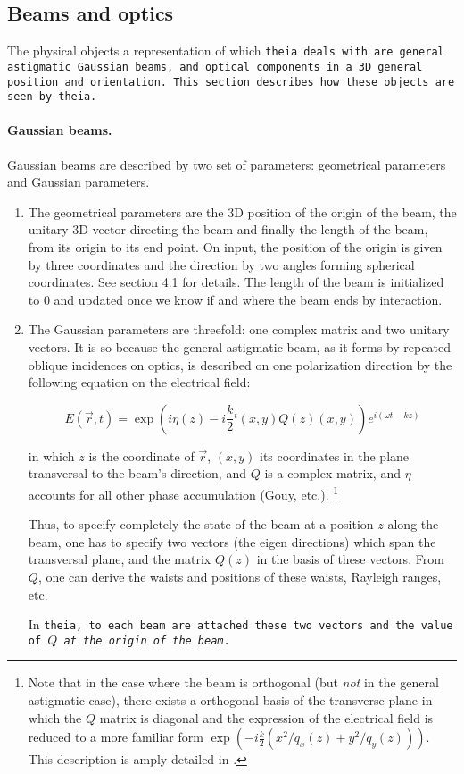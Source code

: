 \documentclass{article}
\begin{document}
\subsection{Beams and optics}
The physical objects a representation of which \tt{theia} deals with are general astigmatic Gaussian beams, and optical components in a 3D general position and orientation. This section describes how these objects are seen by \tt{theia}.



\paragraph{Gaussian beams.}Gaussian beams are described by two set of parameters: geometrical parameters and Gaussian parameters.

\begin{enumerate}
\item The geometrical parameters are the 3D position of the origin of the beam, the unitary 3D vector directing the beam and finally the length of the beam, from its origin to its end point. On input, the position of the origin is given by three coordinates and the direction by two angles forming spherical coordinates. See section 4.1 for details. The length of the beam is initialized to 0 and updated once we know if and where the beam ends by interaction.

\item The Gaussian parameters are threefold: one complex matrix and two unitary vectors. It is so because the general astigmatic beam, as it forms by repeated oblique incidences on optics, is described on one polarization direction by the following equation on the electrical field:

$$ E(\vec r , t) = \exp(i\eta(z) -i\frac{k}{2} {}^t(x,y)Q(z)(x,y))e^{i(\omega t - kz)} $$

in which $z$ is the coordinate of $\vec r$, $(x,y)$ its coordinates in the plane transversal to the beam's direction, and $Q$ is a complex matrix, and $\eta$ accounts for all other phase accumulation (Gouy, etc.). \footnote{Note that in the case where the beam is orthogonal (but \textit{not} in the general astigmatic case), there exists a orthogonal basis of the transverse plane in which the $Q$ matrix is diagonal and the expression of the electrical field is reduced to a more familiar form $\exp(-i\frac{k}{2} (x^2/q_x(z) + y^2/q_y(z)))$. This description is amply detailed in \cite{1,2}.}

Thus, to specify completely the state of the beam at a position $z$ along the beam, one has to specify two vectors (the eigen directions) which span the transversal plane, and the matrix $Q(z)$ in the basis of these vectors. From $Q$, one can derive the waists and positions of these waists, Rayleigh ranges, etc.

In \tt{theia}, to each beam are attached these two vectors and the value of $Q$ \textit{at the origin of the beam}.
\end{enumerate}
\end{document}
